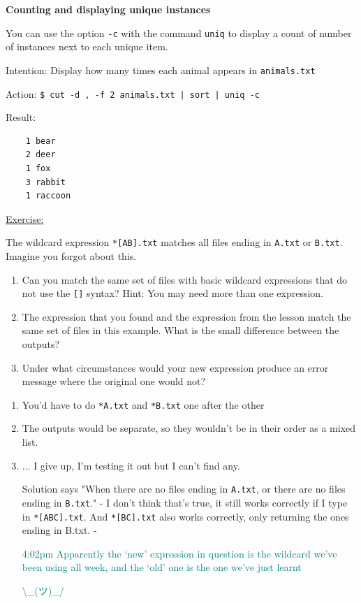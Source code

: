 \documentclass[12pt]{article}
\newenvironment{Japanese}{%
  \CJKfamily{min}%
  \CJKtilde
  \CJKnospace}{}
\begin{document}
\newpage
\textbf{Counting and displaying unique instances}

You can use the option \texttt{-c} with the command \texttt{uniq} to display a count of number of instances next to each unique item.

Intention: Display how many times each animal appears in \texttt{animals.txt}

Action: \texttt{\$ cut -d , -f 2 animals.txt | sort | uniq -c}

Result:\begin{verbatim}
    1 bear
    2 deer
    1 fox
    3 rabbit
    1 raccoon
\end{verbatim}


\begin{addmargin}[1cm]{0cm}
\color{gray}
\vspace{1em}\underline{Exercise:}

The wildcard expression \texttt{*[AB].txt} matches all files ending in \texttt{A.txt} or \texttt{B.txt}. Imagine you forgot about this.
\begin{enumerate}
    \item Can you match the same set of files with basic wildcard expressions that do not use the \texttt{[]} syntax? Hint: You may need more than one expression.
    \item The expression that you found and the expression from the lesson match the same set of files in this example. What is the small difference between the outputs?
    \item Under what circumstances would your new expression produce an error message where the original one would not?
\end{enumerate}

\color{black}
\begin{enumerate}
    \item You'd have to do \texttt{*A.txt} and \texttt{*B.txt} one after the other
    \item The outputs would be separate, so they wouldn't be in their order as a mixed list.
    \item ... I give up, I'm testing it out but I can't find any.
    
    Solution says "When there are no files ending in \texttt{A.txt}, or there are no files ending in \texttt{B.txt}." - I don't think that's true, it still works correctly if I type in \texttt{*[ABC].txt}. And \texttt{*[BC].txt} also works correctly, only returning the ones ending in B.txt. 
    - \textcolor{teal}{\small{4:02pm Apparently the `new' expression in question is the wildcard we've been using all week, and the `old' one is the one we've just learnt 
\begin{CJK}{UTF8}{}
\begin{Japanese}
\textbackslash\_(ツ)\_/
\end{Japanese}
\end{CJK}}}
\end{enumerate}
\end{addmargin}
\end{document}
